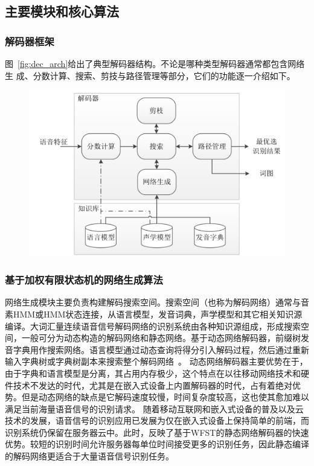 \subsection{主要模块和核心算法}
\label{chap:intro-lvcsr-decmodule}

\subsubsection{解码器框架}

图~\ref{fig:dec_arch}给出了典型解码器结构。不论是哪种类型解码器通常都包含网络生
成、分数计算、搜索、剪技与路径管理等部分，它们的功能逐一介绍如下。

\begin{figure}[!htp]
  \centering
    \captionstyle{\centering}
    \includegraphics[clip=true, width=.9\textwidth]{figure/dec_arch.png}
\end{figure}


\subsubsection{基于加权有限状态机的网络生成算法}
\label{chap:intro2-wfst}

网络生成模块主要负责构建解码搜索空间。搜索空间（也称为解码网络）通常与音素HMM或HMM状态连接，从语言模型，发音词典，声学模型和其它相关知识源编译。大词汇量连续语音信号解码网络的识别系统由各种知识源组成，形成搜索空间，一般可分为动态构造的解码网络和静态网络。基于动态网络解码器，前缀树发音字典用作搜索网络。语言模型通过动态查询将得分引入解码过程，然后通过重新输入字典树或字典树副本来搜索整个解码网络~\cite{young2002htk}。
动态网络解码器主要优势在于，由于字典和语言模型是分离，其占用内存极少，这个特点在以往移动网络技术和硬件技术不发达的时代，尤其是在嵌入式设备上内置解码器的时代，占有着绝对优势。但是动态网络的缺点是它解码速度较慢，时间复杂度较高，这也使其愈加难以满足当前海量语音信号的识别请求。
随着移动互联网和嵌入式设备的普及以及云技术的发展，语音信号的识别应用已发展为仅在嵌入式设备上保持简单的前端，而识别系统仍保留在服务器云中。此时，反映了基于WFST的静态网络解码器的快速优势。较短的识别时间允许服务器每单位时间接受更多的识别任务，因此静态编译的解码网络更适合于大量语音信号识别任务。

